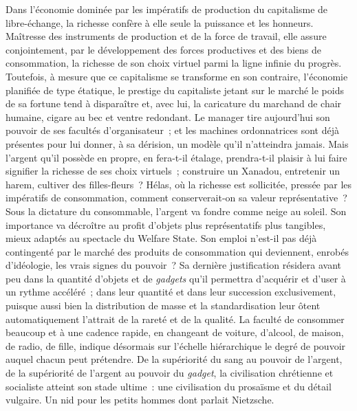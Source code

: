 \documentclass[french,twoside]{book} %
\begin{document}
Dans l’économie dominée par les impératifs de production du capitalisme de libre-échange, la richesse confère à elle seule la puissance et les honneurs. Maîtresse des instruments de production et de la force de travail, elle assure conjointement, par le développement des forces productives et des biens de consommation, la richesse de son choix virtuel parmi la ligne infinie du progrès. Toutefois, à mesure que ce capitalisme se transforme en son contraire, l’économie planifiée de type étatique, le prestige du capitaliste jetant sur le marché le poids de sa fortune tend à disparaître et, avec lui, la caricature du marchand de chair humaine, cigare au bec et ventre redondant. Le manager tire aujourd’hui son pouvoir de ses facultés d’organisateur ; et les machines ordonnatrices sont déjà présentes pour lui donner, à sa dérision, un modèle qu’il n’atteindra jamais. Mais l’argent qu’il possède en propre, en fera-t-il étalage, prendra-t-il plaisir à lui faire signifier la richesse de ses choix virtuels ; construire un Xanadou, entretenir un harem, cultiver des filles-fleurs ? Hélas, où la richesse est sollicitée, pressée par les impératifs de consommation, comment conserverait-on sa valeur représentative ? Sous la dictature du consommable, l’argent va fondre comme neige au soleil. Son importance va décroître au profit d’objets plus représentatifs plus tangibles, mieux adaptés au spectacle du Welfare State. Son emploi n’est-il pas déjà contingenté par le marché des produits de consommation qui deviennent, enrobés d’idéologie, les vrais signes du pouvoir ? Sa dernière justification résidera avant peu dans la quantité d’objets et de \emph{gadgets} qu’il permettra d’acquérir et d’user à un rythme accéléré ; dans leur quantité et dans leur succession exclusivement, puisque aussi bien la distribution de masse et la standardisation leur ôtent automatiquement l’attrait de la rareté et de la qualité. La faculté de consommer beaucoup et à une cadence rapide, en changeant de voiture, d’alcool, de maison, de radio, de fille, indique désormais sur l’échelle hiérarchique le degré de pouvoir auquel chacun peut prétendre. De la supériorité du sang au pouvoir de l’argent, de la supériorité de l’argent au pouvoir du \emph{gadget}, la civilisation chrétienne et socialiste atteint son stade ultime : une civilisation du prosaïsme et du détail vulgaire. Un nid pour les petits hommes dont parlait Nietzsche.\par
\end{document}
